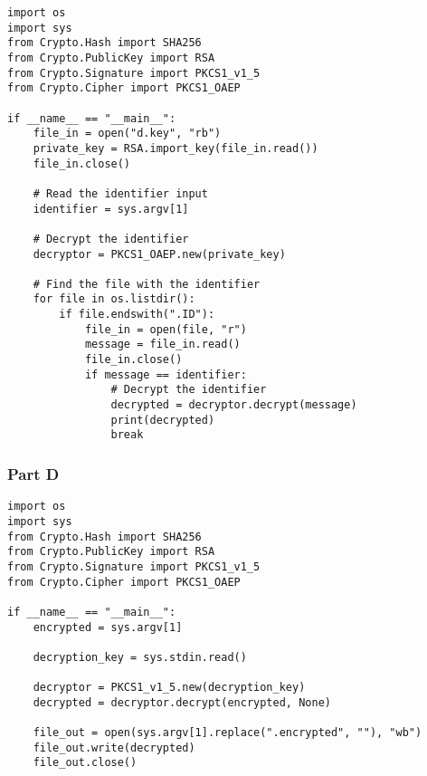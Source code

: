 \documentclass{article}
\begin{document}
\begin{verbatim}
import os
import sys
from Crypto.Hash import SHA256
from Crypto.PublicKey import RSA
from Crypto.Signature import PKCS1_v1_5
from Crypto.Cipher import PKCS1_OAEP

if __name__ == "__main__":
    file_in = open("d.key", "rb")
    private_key = RSA.import_key(file_in.read())
    file_in.close()

    # Read the identifier input
    identifier = sys.argv[1]
    
    # Decrypt the identifier
    decryptor = PKCS1_OAEP.new(private_key)
    
    # Find the file with the identifier
    for file in os.listdir():
        if file.endswith(".ID"):
            file_in = open(file, "r")
            message = file_in.read()
            file_in.close()
            if message == identifier:
                # Decrypt the identifier
                decrypted = decryptor.decrypt(message)
                print(decrypted)
                break
\end{verbatim}

\subsubsection*{Part D}

\begin{verbatim}
import os
import sys
from Crypto.Hash import SHA256
from Crypto.PublicKey import RSA
from Crypto.Signature import PKCS1_v1_5
from Crypto.Cipher import PKCS1_OAEP

if __name__ == "__main__":
    encrypted = sys.argv[1]

    decryption_key = sys.stdin.read()

    decryptor = PKCS1_v1_5.new(decryption_key)
    decrypted = decryptor.decrypt(encrypted, None)

    file_out = open(sys.argv[1].replace(".encrypted", ""), "wb")
    file_out.write(decrypted)
    file_out.close()
\end{verbatim}
\end{document}
